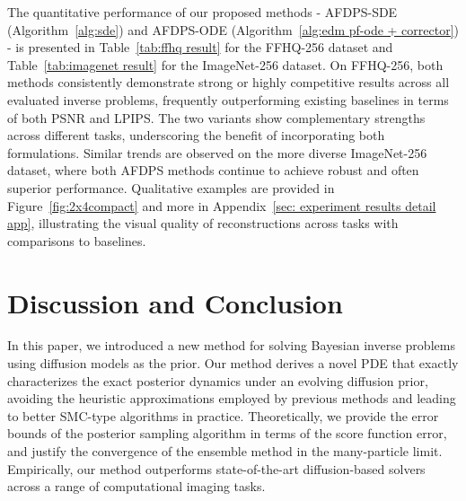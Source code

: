 \documentclass{article}
\numberwithin{equation}{section}
\begin{document}
The quantitative performance of our proposed methods - AFDPS-SDE (Algorithm~\ref{alg:sde}) and AFDPS-ODE (Algorithm~\ref{alg:edm pf-ode + corrector}) - is presented in Table~\ref{tab:ffhq result} for the FFHQ-256 dataset and Table~\ref{tab:imagenet result} for the ImageNet-256 dataset. On FFHQ-256, both methods consistently demonstrate strong or highly competitive results across all evaluated inverse problems, frequently outperforming existing baselines in terms of both PSNR and LPIPS. The two variants show complementary strengths across different tasks, underscoring the benefit of incorporating both formulations. Similar trends are observed on the more diverse ImageNet-256 dataset, where both AFDPS methods continue to achieve robust and often superior performance. Qualitative examples are provided in Figure~\ref{fig:2x4compact} and more in Appendix~\ref{sec: experiment results detail app}, illustrating the visual quality of reconstructions across tasks with comparisons to baselines.


\section{Discussion and Conclusion}

In this paper, we introduced a new method for solving Bayesian inverse problems using diffusion models as the prior. Our method derives a novel PDE that exactly characterizes the exact posterior dynamics under an evolving diffusion prior, avoiding the heuristic approximations employed by previous methods and leading to better SMC-type algorithms in practice.
Theoretically, we provide the error bounds of the posterior sampling algorithm in terms of the score function error, and justify the convergence of the ensemble method in the many-particle limit. Empirically, our method outperforms state-of-the-art diffusion-based solvers across a range of computational imaging tasks.
\end{document}
